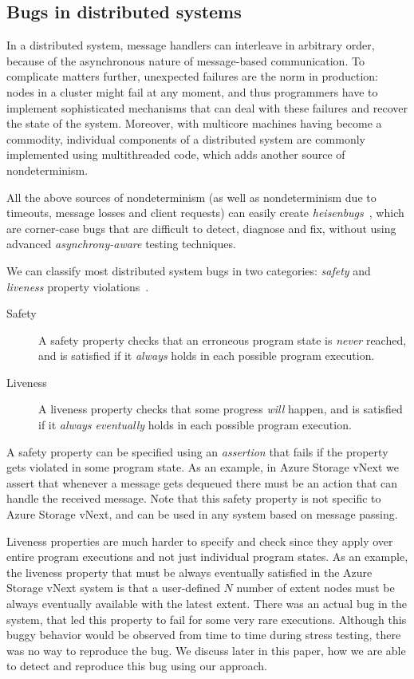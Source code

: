 \subsection{Bugs in distributed systems}
\label{sec:overview:bugs}

In a distributed system, message handlers can interleave in arbitrary order, because of the asynchronous nature of message-based communication. To complicate matters further, unexpected failures are the norm in production: nodes in a cluster might fail at any moment, and thus programmers have to implement sophisticated mechanisms that can deal with these failures and recover the state of the system. Moreover, with multicore machines having become a commodity, individual components of a distributed system are commonly implemented using multithreaded code, which adds another source of nondeterminism.

All the above sources of nondeterminism (as well as nondeterminism due to timeouts, message losses and client requests) can easily create \emph{heisenbugs}~\cite{gray1986computers, musuvathi2008finding}, which are corner-case bugs that are difficult to detect, diagnose and fix, without using advanced \emph{asynchrony-aware} testing techniques.

We can classify most distributed system bugs in two categories: \emph{safety} and \emph{liveness} property violations~\cite{lamport1977proving}.

\begin{description}
\item[Safety] A safety property checks that an erroneous program state is \emph{never} reached, and is satisfied if it \emph{always} holds in each possible program execution.

\item[Liveness] A liveness property checks that some progress \emph{will} happen, and is satisfied if it \emph{always eventually} holds in each possible program execution.
\end{description}

\noindent
A safety property can be specified using an \emph{assertion} that fails if the property gets violated in some program state. As an example, in Azure Storage vNext we assert that whenever a message gets dequeued there must be an action that can handle the received message. Note that this safety property is not specific to Azure Storage vNext, and can be used in any system based on message passing.

Liveness properties are much harder to specify and check since they apply over entire program executions and not just individual program states. As an example, the liveness property that must be always eventually satisfied in the Azure Storage vNext system is that a user-defined $N$ number of extent nodes must be always eventually available with the latest extent. There was an actual bug in the system, that led this property to fail for some very rare executions. Although this buggy behavior would be observed from time to time during stress testing, there was no way to reproduce the bug. We discuss later in this paper, how we are able to detect and reproduce this bug using our approach.

